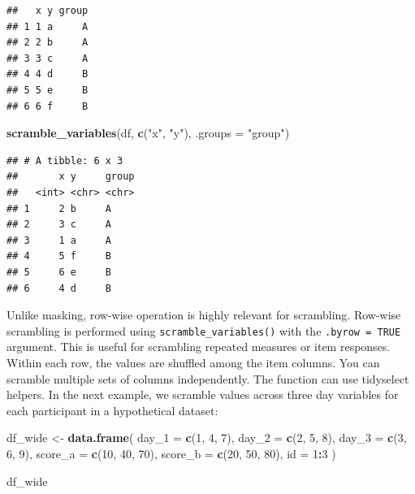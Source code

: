 \documentclass[
  english,
  man,floatsintext]{apa6}
\newenvironment{Shaded}{\begin{snugshade}}{\end{snugshade}}
\newcommand{\AttributeTok}[1]{\textcolor[rgb]{0.13,0.29,0.53}{#1}}
\newcommand{\DecValTok}[1]{\textcolor[rgb]{0.00,0.00,0.81}{#1}}
\newcommand{\FunctionTok}[1]{\textcolor[rgb]{0.13,0.29,0.53}{\textbf{#1}}}
\newcommand{\NormalTok}[1]{#1}
\newcommand{\OtherTok}[1]{\textcolor[rgb]{0.56,0.35,0.01}{#1}}
\newcommand{\SpecialCharTok}[1]{\textcolor[rgb]{0.81,0.36,0.00}{\textbf{#1}}}
\newcommand{\StringTok}[1]{\textcolor[rgb]{0.31,0.60,0.02}{#1}}
\begin{document}
\begin{verbatim}
##   x y group
## 1 1 a     A
## 2 2 b     A
## 3 3 c     A
## 4 4 d     B
## 5 5 e     B
## 6 6 f     B
\end{verbatim}

\begin{Shaded}
\begin{Highlighting}[]
\FunctionTok{scramble\_variables}\NormalTok{(df, }\FunctionTok{c}\NormalTok{(}\StringTok{"x"}\NormalTok{, }\StringTok{"y"}\NormalTok{), }\AttributeTok{.groups =} \StringTok{"group"}\NormalTok{)}
\end{Highlighting}
\end{Shaded}

\begin{verbatim}
## # A tibble: 6 x 3
##       x y     group
##   <int> <chr> <chr>
## 1     2 b     A    
## 2     3 c     A    
## 3     1 a     A    
## 4     5 f     B    
## 5     6 e     B    
## 6     4 d     B
\end{verbatim}

Unlike masking, row-wise operation is highly relevant for scrambling. Row-wise scrambling is performed using \texttt{scramble\_variables()} with the \texttt{.byrow\ =\ TRUE} argument. This is useful for scrambling repeated measures or item responses. Within each row, the values are shuffled among the item columns. You can scramble multiple sets of columns independently. The function can use tidyselect helpers. In the next example, we scramble values across three day variables for each participant in a hypothetical dataset:

\begin{Shaded}
\begin{Highlighting}[]
\NormalTok{df\_wide }\OtherTok{\textless{}{-}} \FunctionTok{data.frame}\NormalTok{(}
  \AttributeTok{day\_1 =} \FunctionTok{c}\NormalTok{(}\DecValTok{1}\NormalTok{, }\DecValTok{4}\NormalTok{, }\DecValTok{7}\NormalTok{),}
  \AttributeTok{day\_2 =} \FunctionTok{c}\NormalTok{(}\DecValTok{2}\NormalTok{, }\DecValTok{5}\NormalTok{, }\DecValTok{8}\NormalTok{),}
  \AttributeTok{day\_3 =} \FunctionTok{c}\NormalTok{(}\DecValTok{3}\NormalTok{, }\DecValTok{6}\NormalTok{, }\DecValTok{9}\NormalTok{),}
  \AttributeTok{score\_a =} \FunctionTok{c}\NormalTok{(}\DecValTok{10}\NormalTok{, }\DecValTok{40}\NormalTok{, }\DecValTok{70}\NormalTok{),}
  \AttributeTok{score\_b =} \FunctionTok{c}\NormalTok{(}\DecValTok{20}\NormalTok{, }\DecValTok{50}\NormalTok{, }\DecValTok{80}\NormalTok{),}
  \AttributeTok{id =} \DecValTok{1}\SpecialCharTok{:}\DecValTok{3}
\NormalTok{)}

\NormalTok{df\_wide}
\end{Highlighting}
\end{Shaded}
\end{document}
